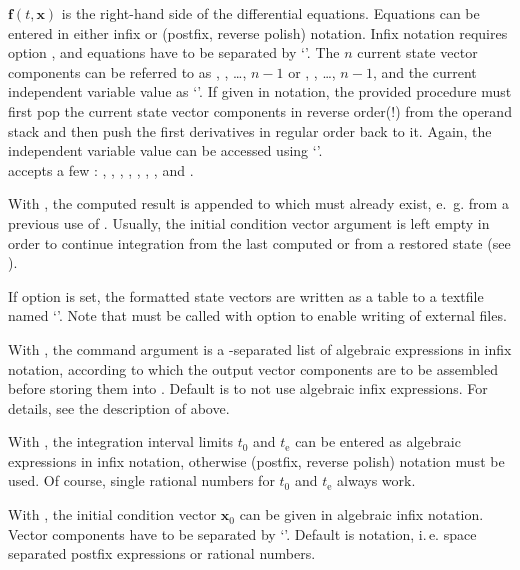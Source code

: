 \documentclass[11pt,english,BCOR10mm,DIV12,bibliography=totoc,parskip=false,smallheadings
    headexclude,footexclude,oneside,dvips,UKenglish]{pst-doc}
\begin{document}
$\mathbf{f}(t,\mathbf{x})$ is the right-hand side of the differential equations. Equations can be entered in either infix or \PS{} (postfix, reverse polish) notation. Infix notation requires option , and equations have to be separated by `\Lkeyword{|}'. The $n$ current state vector components can be referred to as , , \dots, \Lkeyword{x[}$n-1$\Lkeyword{]} or , , \dots, \Lkeyword{y[}$n-1$\Lkeyword{]}, and the current independent variable value as `'. If given in \PS{} notation, the provided procedure must first pop the current state vector components in reverse order(!) from the operand stack and then push the first derivatives in regular order back to it. Again, the independent variable value can be accessed using `'.\\[1ex]
 accepts a few \OptArgs: , , , , , , ,  and .

With , the computed result is appended to  which must already exist, e.\, g. from a previous use of . Usually, the initial condition vector argument is left empty in order to continue integration from the last computed or from a restored state (see ).

If option  is set, the formatted state vectors are written as a table to a textfile named `'. Note that  must be called with option  to enable writing of external files.

With , the command argument  is a \Lkeyword{|}-separated list of algebraic expressions in infix notation, according to which the output vector components are to be assembled before storing them into . Default is to not use algebraic infix expressions. For details, see the description of  above.

With , the integration interval limits $t_0$ and $t_\mathrm{e}$ can be entered as algebraic expressions in infix notation, otherwise \PS{} (postfix, reverse polish) notation must be used. Of course, single rational numbers for  $t_0$ and $t_\mathrm{e}$ always work.

With , the initial condition vector $\mathbf{x}_0$ can be given in algebraic infix notation. Vector components have to be separated by `\Lkeyword{|}'. Default is \PS{} notation, i.\,e. space separated postfix expressions or rational numbers.
\end{document}
